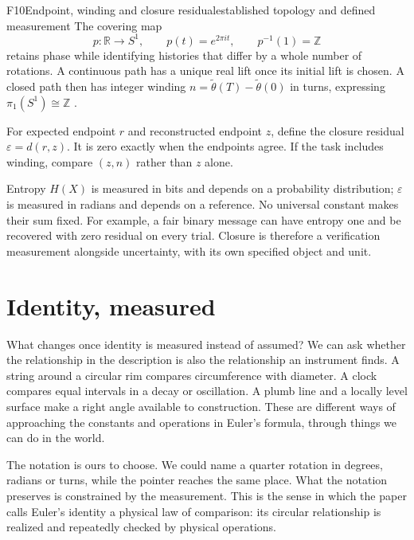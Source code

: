 \documentclass[11pt,a4paper]{article}
\newcommand{\R}{\mathbb{R}}
\newcommand{\Z}{\mathbb{Z}}
\begin{document}
\begin{formal}{F10}{Endpoint, winding and closure residual}{established topology and defined measurement}
The covering map
\begin{equation}
 p:\R\to S^1,\qquad p(t)=e^{2\pi it},\qquad p^{-1}(1)=\Z
\end{equation}
retains phase while identifying histories that differ by a whole number of
rotations. A continuous path has a unique real lift once its initial lift is
chosen. A closed path then has integer winding
$n=\widetilde\theta(T)-\widetilde\theta(0)$ in turns, expressing
$\pi_1(S^1)\cong\Z$ \citep{LicataShulman2013}.

For expected endpoint $r$ and reconstructed endpoint $z$, define the closure
residual $\varepsilon=d(r,z)$. It is zero exactly when the endpoints agree.
If the task includes winding, compare $(z,n)$ rather than $z$ alone.

Entropy $H(X)$ is measured in bits and depends on a probability distribution;
$\varepsilon$ is measured in radians and depends on a reference. No universal
constant makes their sum fixed. For example, a fair binary message can have
entropy one and be recovered with zero residual on every trial. Closure is
therefore a verification measurement alongside uncertainty, with its own
specified object and unit.
\end{formal}

\section{Identity, measured}
\label{sec:measurement}

What changes once identity is measured instead of assumed? We can ask whether
the relationship in the description is also the relationship an instrument
finds. A string around a circular rim compares circumference with diameter.
A clock compares equal intervals in a decay or oscillation. A plumb line and
a locally level surface make a right angle available to construction. These
are different ways of approaching the constants and operations in Euler's
formula, through things we can do in the world.

The notation is ours to choose. We could name a quarter rotation in degrees,
radians or turns, while the pointer reaches the same place. What the notation
preserves is constrained by the measurement. This is the sense in which the
paper calls Euler's identity a physical law of comparison: its circular
relationship is realized and repeatedly checked by physical operations.
\end{document}

